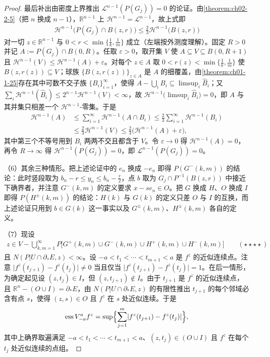 \documentclass[../../main.tex]{subfiles}%
\begin{document}
\begin{proof}
最后补出由密度上界推出 $\mathcal{L}^{n-1}(P(G_j))=0$ 的论证。由\cref{theorem:ch02-2-5}（把 $n$ 换成 $n-1$），$\mathbb{R}^{n-1}$ 上 $\mathcal{H}^{n-1}=\mathcal{L}^{n-1}$，故上式即%
\begin{align*}
\mathcal{H}^{n-1}\bigl(P(G_j)\cap B(z,r)\bigr)\leqslant\frac23\mathcal{H}^{n-1}\bigl(B(z,r)\bigr)
\end{align*}
对一切 $z\in\mathbb{R}^{n-1}$ 与 $0<r<\min\{\frac1k,\frac1m\}$ 成立（左端按外测度理解）。固定 $R>0$ 并记 $A:=P(G_j)\cap B(0,R)$。任取 $\varepsilon>0$，取开集 $V$ 使 $A\subseteq V\subseteq B(0,R+1)$ 且 $\mathcal{H}^{n-1}(V)\leqslant\mathcal{H}^{n-1}(A)+\varepsilon$。对每个 $z\in A$ 取 $0<r(z)<\min\{\frac1k,\frac1m\}$ 使 $B(z,r(z))\subseteq V$；球族 $\{B(z,r(z))\}_{z\in A}$ 是 $A$ 的细覆盖，由\cref{theorem:ch01-1-25}存在其中可数不交子族 $\{B_i\}_{i=1}^{\infty}$，使得 $A-\bigcup_iB_i\subseteq\limsup_{i}\hat B_i$；又 $\sum_i\mathcal{H}^{n-1}(\hat B_i)\leqslant2^{n-1}\mathcal{H}^{n-1}(V)<\infty$，故 $\mathcal{H}^{n-1}\bigl(\limsup_{i}\hat B_i\bigr)=0$，即 $A$ 与其并集只相差一个 $\mathcal{H}^{n-1}$-零集。于是 %
\begin{align*}
\mathcal{H}^{n-1}(A)&\leqslant\sum_{i=1}^{\infty}\mathcal{H}^{n-1}(A\cap B_i)\leqslant\frac23\sum_{i=1}^{\infty}\mathcal{H}^{n-1}(B_i)\\
&\leqslant\frac23\mathcal{H}^{n-1}(V)\leqslant\frac23\bigl(\mathcal{H}^{n-1}(A)+\varepsilon\bigr),
\end{align*}
其中第三个不等号用到 $B_i$ 两两不交且都含于 $V$。令 $\varepsilon\to0$ 得 $\mathcal{H}^{n-1}(A)=0$，再令 $R\to\infty$ 得 $\mathcal{H}^{n-1}(P(G_j))=0$，即 $\mathcal{L}^{n-1}(P(G_j))=0$。

（6）其余三种情形。把上述论证中的 $e_n$ 换成 $-e_n$ 即得 $P(G^{-}(k,m))$ 的结论：此时竖段取为 $b_n-r\leqslant y_n\leqslant b_n-\frac r2$，点 $b$ 取为 $G_j\cap P^{-1}(B(z,r))$ 中接近下确界者，并注意 $G^{-}(k,m)$ 的定义要求 $x-se_n\in O$。把 $G$ 换成 $H$、$O$ 换成 $I$ 即得 $P(H^{\pm}(k,m))$ 的结论：$H(k)$ 与 $G(k)$ 的定义只差 $O$ 与 $I$ 的互换，而上述论证只用到 $b\in G(k)$ 这一事实以及 $G^{\pm}(k,m)$、$H^{\pm}(k,m)$ 各自的定义。

（7）现设
\begin{align*}
z\in V-\bigcup_{k,m=1}^{\infty}P\bigl[G^{+}(k,m)\cup G^{-}(k,m)\cup H^{+}(k,m)\cup H^{-}(k,m)\bigr]\qquad(\star\star\star\star)
\end{align*}
且 $N(P|U\cap\partial_*E,z)<\infty$。设 $-a<t_1<\cdots<t_{m+1}<a$ 是 $f^z$ 的近似连续点。注意 $\lvert f^z(t_{j+1})-f^z(t_j)\rvert\neq0$ 当且仅当 $\lvert f^z(t_{j+1})-f^z(t_j)\rvert=1$。在后一情形，为确定起见设 $(z,t_j)\in I$，但 $(z,t_{j+1})\notin I$。由于 $t_{j+1}$ 是 $f^z$ 的近似连续点，且 $\mathbb{R}^n-(O\cup I)=\partial_*E$，由 $N(P|U\cap\partial_*E,z)$ 的有限性推出 $t_{j+1}$ 的每个邻域必含有点 $s$，使得 $(z,s)\in O$ 且 $f^z$ 在 $s$ 处近似连续。于是
\begin{align*}
\operatorname{ess}V_{-a}^{a}f^z=\sup\Bigl\{\sum_{j=1}^{m}\lvert f^z(t_{j+1})-f^z(t_j)\rvert\Bigr\},
\end{align*}
其中上确界取遍满足 $-a<t_1<\cdots<t_{m+1}<a$、$(z,t_j)\in(O\cup I)$ 且 $f^z$ 在每个 $t_j$ 处近似连续的点组。


\end{proof}
\end{document}
